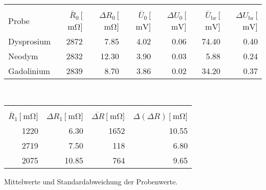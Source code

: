 
\begin{table}[!h]
\begin{center}
\begin{tabular}{|l|r|r|r|r|r|r|}
\hline
 & & & & & & \\
Probe & $\bar R_\mathrm{0}$\,[$\SI{}{\milli\ohm}$]& $\Delta R_\mathrm{0}$\,[$\SI{}{\milli\ohm}$] & $\bar U_\mathrm{0}$\,[$\SI{}{\milli\volt}$] & $\Delta U_\mathrm{0}$\,[$\SI{}{\milli\volt}$] & $\bar U_\mathrm{br}$\,[$\SI{}{\milli\volt}$] & $\Delta U_\mathrm{br}$\,[$\SI{}{\milli\volt}$]\\
\hline
\hline

Dysprosium & 2872 & 7.85  & 4.02 & 0.06 & 74.40 & 0.40\\
Neodym     & 2832 & 12.30 & 3.90 & 0.03 & 5.88  & 0.24\\
Gadolinium & 2839 & 8.70  & 3.86 & 0.02 & 34.20 & 0.37\\

\hline
\end{tabular}
\end{center}
\begin{center}
\begin{tabular}{|r|r|r|r|}
\hline
&&&\\
$\bar R_\mathrm{1}$\,[$\SI{}{\milli\ohm}$] & $\Delta R_\mathrm{1}$\,[$\SI{}{\milli\ohm}$] & $\overline{\Delta R}$\,[$\SI{}{\milli\ohm}$] & $\Delta(\Delta R)$\,[$\SI{}{\milli\ohm}$]\\
\hline
\hline
1220 & 6.30  & 1652 & 10.55\\
2719 & 7.50  & 118  & 6.80\\
2075 & 10.85 & 764  & 9.65\\
\hline
\end{tabular}
\caption\,{Mittelwerte und Standardabweichung der Probenwerte.}
\label{Mittelwerte}
\end{center}
\end{table}